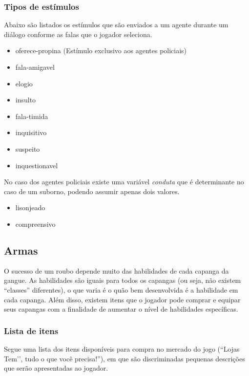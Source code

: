 \subsubsection{Tipos de estímulos}
Abaixo são listados os estímulos que são enviados a um agente durante um diálogo conforme as falas que o jogador seleciona.
\begin{itemize}
\item oferece-propina (Estímulo exclusivo aos agentes policiais)
\item fala-amigavel
\item elogio
\item insulto
\item fala-timida
\item inquisitivo
\item suspeito
\item inquestionavel
\end{itemize}

No caso dos agentes policiais existe uma variável \emph{conduta} que é determinante no caso de um suborno, podendo assumir apenas dois valores.
\begin{itemize}
\item lisonjeado
\item compreensivo
\end{itemize}


\subsection{Armas}
O sucesso de um roubo depende muito das habilidades de cada capanga da gangue. As habilidades são iguais para todos os capangas (ou seja, não existem ``classes'' diferentes), o que varia é o quão bem desenvolvida é a habilidade em cada capanga. Além disso, existem itens que o jogador pode comprar e equipar seus capangas com a finalidade de aumentar o nível de habilidades específicas.

\subsubsection{Lista de itens}

Segue uma lista dos itens disponíveis para compra no mercado do jogo (``Lojas Tem’’, tudo o que você precisa!''), em que são discriminadas pequenas descrições que serão apresentadas ao jogador.

